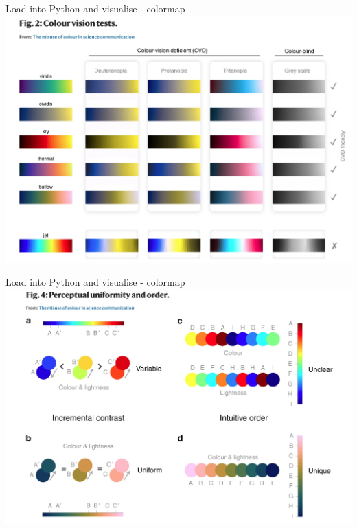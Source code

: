  
\begin{frame}{\insertsectionnumber{ |} Load into Python and visualise - colormap} 
    \vspace{0.5cm}
    \includegraphics[scale=0.20]{images/Colormap_1.png}
\end{frame}
 
 
\begin{frame}{\insertsectionnumber{ |} Load into Python and visualise - colormap}
    \vspace{0.5cm}
    \includegraphics[scale=0.20]{images/Colormap_2.png}
\end{frame}
  
